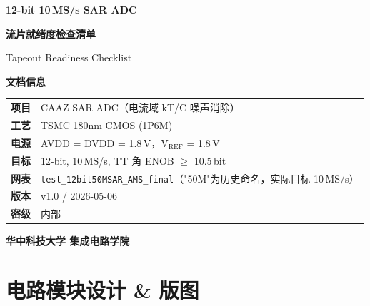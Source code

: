 \documentclass[12pt,a4paper,fontset=none]{ctexart}
\newcommand{\needtable}{\needspace{6cm}}   %
\begin{document}
\begin{titlepage}
\centering
\vspace*{3cm}

{\Huge\bfseries 12-bit 10\,MS/s SAR ADC\par}
\vspace{0.5cm}
{\huge\bfseries 流片就绪度检查清单\par}
\vspace{1cm}
{\Large Tapeout Readiness Checklist\par}

\vspace{2cm}

{\large\bfseries 文档信息\par}
\vspace{0.5cm}
\begin{tabular}{@{}r@{\quad}l@{}}
\toprule
\textbf{项目} & CAAZ SAR ADC（电流域 kT/C 噪声消除） \\
\textbf{工艺} & TSMC 180nm CMOS (1P6M) \\
\textbf{电源} & AVDD = DVDD = 1.8\,V，V$_{\text{REF}}$ = 1.8\,V \\
\textbf{目标} & 12-bit, 10\,MS/s, TT 角 ENOB $\ge$ 10.5\,bit \\
\textbf{网表} & \texttt{test\_12bit50MSAR\_AMS\_final}（"50M"为历史命名，实际目标 10\,MS/s） \\
\textbf{版本} & v1.0 / 2026-05-06 \\
\textbf{密级} & 内部 \\
\bottomrule
\end{tabular}

\vspace{2cm}
{\large\bfseries 华中科技大学 集成电路学院\par}
\vfill
\end{titlepage}

\newpage
\tableofcontents
\newpage

\needtable
\section{电路模块设计 \& 版图}
\end{document}

